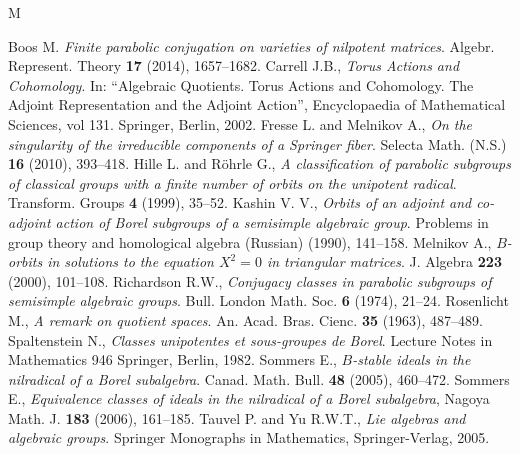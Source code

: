 \documentclass{amsart}
\theoremstyle{definition}
\theoremstyle{remark}
\numberwithin{equation}{section}
\begin{document}
\begin{thebibliography}{M}%

 Boos M. \textit{Finite parabolic conjugation on varieties of nilpotent matrices}.
Algebr. Represent. Theory {\bf 17} (2014), 1657--1682. 
 Carrell J.B., \textit{Torus Actions and Cohomology}. In: ``Algebraic Quotients. Torus Actions and Cohomology. The Adjoint Representation and the Adjoint Action'', Encyclopaedia of Mathematical Sciences, vol 131. 
Springer, Berlin, 2002.
 Fresse L. and Melnikov A., \textit{On the singularity of the irreducible components of a Springer fiber}. Selecta Math. (N.S.) {\bf 16} (2010), 393--418. 
 Hille L. and R\"ohrle G., \textit{A classification of parabolic subgroups of classical groups with 
a finite number of orbits on the unipotent radical}. Transform. Groups {\bf 4} (1999), 35--52.
 Kashin V. V., \textit{Orbits of an adjoint and co-adjoint action of Borel subgroups of a 
semisimple algebraic group}. Problems in group theory and homological algebra (Russian) 
(1990), 141--158.
 Melnikov A., \textit{$B$-orbits in solutions to the equation $X^{2}=0$ in triangular matrices}.
J. Algebra {\bf 223} (2000), 101--108.
 Richardson R.W., \textit{Conjugacy classes in parabolic subgroups of semisimple algebraic groups}. 
Bull. London Math. Soc. {\bf 6} (1974), 21--24.
 Rosenlicht M., \textit{A remark on quotient spaces}. 
An. Acad. Bras. Cienc. {\bf 35} (1963), 487--489.
 Spaltenstein N., \textit{Classes unipotentes et sous-groupes de Borel}. 
Lecture Notes in Mathematics 946 Springer, Berlin, 1982. 
 Sommers E., \textit{$B$-stable ideals in the nilradical of a Borel subalgebra}. 
Canad. Math. Bull. {\bf 48} (2005), 460--472.
 Sommers E., \textit{Equivalence classes of ideals in the nilradical of a Borel subalgebra}, 
Nagoya Math. J. {\bf 183} (2006), 161--185.
 Tauvel P. and Yu R.W.T., \textit{Lie algebras and algebraic groups}. 
Springer Monographs in Mathematics, Springer-Verlag, 2005.
\end{thebibliography}
\end{document}
